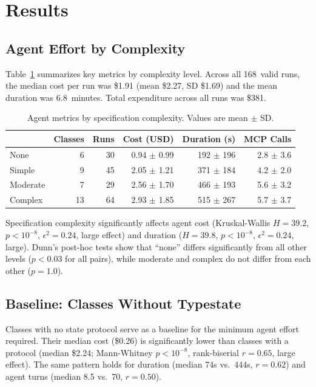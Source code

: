 \documentclass[sigconf]{acmart}
\begin{document}
\section{Results}

\subsection{Agent Effort by Complexity}

Table~\ref{tab:complexity} summarizes key metrics by complexity level. Across all 168~valid runs, the median cost per run was \$1.91 (mean \$2.27, SD \$1.69) and the mean duration was 6.8~minutes. Total expenditure across all runs was \$381.

\begin{table}[t]
\caption{Agent metrics by specification complexity. Values are mean $\pm$ SD.}
\label{tab:complexity}
\begin{tabular}{lrrrrr}
\toprule
 & Classes & Runs & Cost (USD) & Duration (s) & MCP Calls \\
\midrule
None     & 6  & 30 & 0.94 $\pm$ 0.99 & 192 $\pm$ 196 & 2.8 $\pm$ 3.6 \\
Simple   & 9  & 45 & 2.05 $\pm$ 1.21 & 371 $\pm$ 184 & 4.2 $\pm$ 2.0 \\
Moderate & 7  & 29 & 2.56 $\pm$ 1.70 & 466 $\pm$ 193 & 5.6 $\pm$ 3.2 \\
Complex  & 13 & 64 & 2.93 $\pm$ 1.85 & 515 $\pm$ 267 & 5.7 $\pm$ 3.7 \\
\bottomrule
\end{tabular}
\end{table}

Specification complexity significantly affects agent cost (Kruskal-Wallis $H = 39.2$, $p < 10^{-8}$, $\epsilon^2 = 0.24$, large effect) and duration ($H = 39.8$, $p < 10^{-8}$, $\epsilon^2 = 0.24$, large). Dunn's post-hoc tests show that ``none'' differs significantly from all other levels ($p < 0.03$ for all pairs), while moderate and complex do not differ from each other ($p = 1.0$).

\subsection{Baseline: Classes Without Typestate}

Classes with no state protocol serve as a baseline for the minimum agent effort required. Their median cost (\$0.26) is significantly lower than classes with a protocol (median \$2.24; Mann-Whitney $p < 10^{-8}$, rank-biserial $r = 0.65$, large effect). The same pattern holds for duration (median 74s vs.\ 444s, $r = 0.62$) and agent turns (median 8.5 vs.\ 70, $r = 0.50$).
\end{document}
